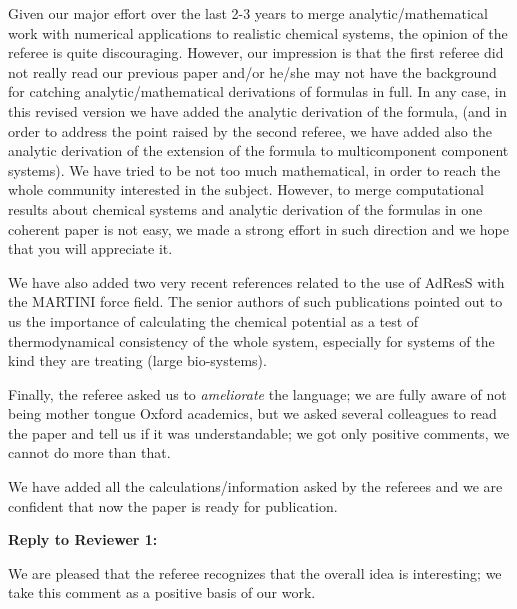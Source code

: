 \documentclass[12pt]{article}
\begin{document}
Given our major effort over the last 2-3 years to merge analytic/mathematical work with numerical applications to realistic chemical systems, the opinion of the referee is quite discouraging. 
However, our impression is that the first referee did not really read our previous paper and/or he/she may not have the background for catching analytic/mathematical derivations of formulas in full. In any case, in this revised version we have added the analytic derivation of the formula, (and in order to address the point raised by the second referee, we have added also the analytic derivation of the extension of the formula to multicomponent component systems). We have tried to be not too much mathematical, in order to reach the whole community interested in the subject. However, to merge computational results about chemical systems and analytic derivation of the formulas in one coherent paper is not easy, we made a strong effort in such direction and we hope that you will appreciate it.

We have also added two very recent references related to the use of AdResS with the MARTINI force field. The senior authors of such publications pointed out to us the importance of calculating the chemical potential as a test of thermodynamical consistency of the whole system, especially for systems of the kind they are treating (large bio-systems).

Finally, the referee asked us to {\it ameliorate} the language; we are fully aware of not being mother tongue Oxford academics, but we asked several colleagues to read the paper and tell us if it was understandable; we got only positive comments, we cannot do more than that.

We have added all the calculations/information asked by the referees and we are confident that now the paper is ready for publication.


\newpage

{\bf Reply to Reviewer 1:}

{\color{blue}{\it ``..... The idea of calculating excess
    chemical potentials from adaptive resolution techniques is appealing}}

We are pleased that the referee recognizes that the overall idea is interesting; we take this comment as a positive basis of our work.

{\color{blue}{\it ``This work is in fact a sort of extension of Ref. 5, and its contribution is just to offer a check of the
statements, hypothesis and calculations made on that previous paper. It is not easy to judge the relevance of this
work because it might contain enough simulations, but not new information. In fact, its main contribution is a table, with comparison with reported data.}}
\end{document}
